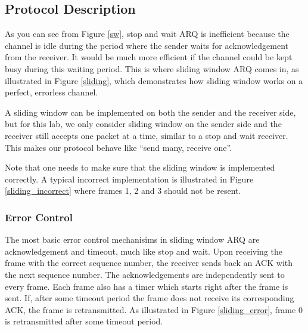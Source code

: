 \documentclass[11pt]{article}
\begin{document}
\subsection{Protocol Description}
\label{sec:protocol}

As you can see from Figure \ref{sw}, stop and wait ARQ is inefficient because the channel is idle during the period where the sender waits for acknowledgement from the receiver.
It would be much more efficient if the channel could be kept busy during this waiting period. This is where sliding window ARQ comes in, as illustrated in Figure \ref{sliding},
which demonstrates how sliding window works on a perfect, errorless channel.

\noindent A sliding window can be implemented on both the sender and the receiver side, but for this lab, we only consider sliding window on the sender side and the receiver still accepts one packet
at a time, similar to a stop and wait receiver. This makes our protocol behave like  ``send many, receive one''.

\noindent Note that one needs to make sure that the sliding window is implemented correctly. A typical incorrect implementation is illustrated in Figure \ref{sliding_incorrect}
where frames 1, 2 and 3 should not be resent.


\subsubsection{Error Control}
The most basic error control mechanisims in sliding window ARQ are acknowledgement and timeout, much like stop and wait. Upon receiving the frame with the correct sequence number,
the receiver sends back an ACK with the next sequence number. The acknowledgements are independently sent to every frame. Each frame also has a timer which starts right after the 
frame is sent. If, after some timeout period the frame does not receive its corresponding ACK, the frame is retransmitted. As illustrated in Figure \ref{sliding_error}, frame 0 is retransmitted after
some timeout period.
\end{document}
